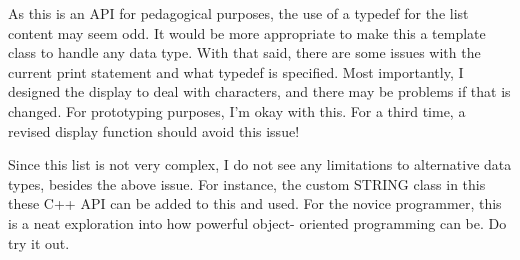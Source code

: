 As this is an A\-P\-I for pedagogical purposes, the use of a typedef for the list content may seem odd. It would be more appropriate to make this a template class to handle any data type. With that said, there are some issues with the current print statement and what typedef is specified. Most importantly, I designed the display to deal with characters, and there may be problems if that is changed. For prototyping purposes, I'm okay with this. For a third time, a revised display function should avoid this issue!

Since this list is not very complex, I do not see any limitations to alternative data types, besides the above issue. For instance, the custom S\-T\-R\-I\-N\-G class in this these C++ A\-P\-I can be added to this and used. For the novice programmer, this is a neat exploration into how powerful object-\/ oriented programming can be. Do try it out. 